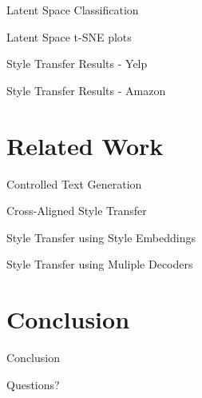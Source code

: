 \documentclass[aspectratio=169]{beamer}
\begin{document}
\begin{frame}{Latent Space Classification}
\end{frame}

\begin{frame}{Latent Space t-SNE plots}
\end{frame}

\begin{frame}{Style Transfer Results - Yelp}
\end{frame}

\begin{frame}{Style Transfer Results - Amazon}
\end{frame}

% 

\section{Related Work}

\begin{frame}{Controlled Text Generation}
\end{frame}

\begin{frame}{Cross-Aligned Style Transfer}
\end{frame}

\begin{frame}{Style Transfer using Style Embeddings}
\end{frame}

\begin{frame}{Style Transfer using Muliple Decoders}
\end{frame}

% 

\section{Conclusion}

\begin{frame}{Conclusion}
\end{frame}

\begin{frame}[allowframebreaks]
	
	
\end{frame}

\begin{frame}
	\centering
	\Huge{Questions?}
\end{frame}
\end{document}
